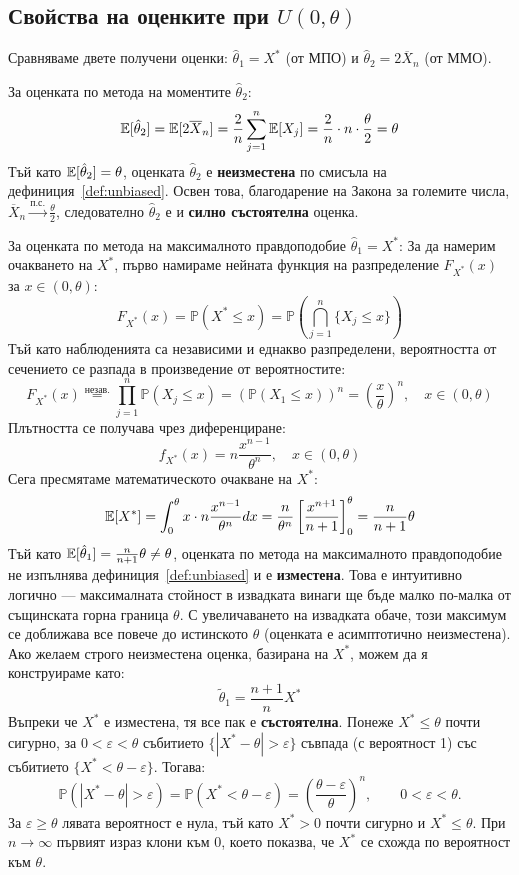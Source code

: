 \subsection{Свойства на оценките при $U(0, \theta)$}

Сравняваме двете получени оценки: $\hat{\theta}_1 = X^*$ (от МПО) и $\hat{\theta}_2 = 2 \overline{X}_n$ (от ММО).

За оценката по метода на моментите $\hat{\theta}_2$:
\[
    \mathbb{E}[\hat{\theta}_2] = \mathbb{E}[2 \overline{X}_n] = \frac{2}{n} \sum_{j=1}^n \mathbb{E}[X_j] = \frac{2}{n} \cdot n \cdot \frac{\theta}{2} = \theta
\]
Тъй като $\mathbb{E}[\hat{\theta}_2] = \theta$, оценката $\hat{\theta}_2$ е \textbf{неизместена} по смисъла на дефиниция~\ref{def:unbiased}. Освен това, благодарение на Закона за големите числа, $\overline{X}_n \xrightarrow{\text{п.с.}} \frac{\theta}{2}$, следователно $\hat{\theta}_2$ е и \textbf{силно състоятелна} оценка.

За оценката по метода на максималното правдоподобие $\hat{\theta}_1 = X^*$:
За да намерим очакването на $X^*$, първо намираме нейната функция на разпределение $F_{X^*}(x)$ за $x \in (0, \theta)$:
\[
    F_{X^*}(x) = \mathbb{P}(X^* \le x) = \mathbb{P}\left(\bigcap_{j=1}^n \{X_j \le x\}\right)
\]
Тъй като наблюденията са независими и еднакво разпределени, вероятността от сечението се разпада в произведение от вероятностите:
\[
    F_{X^*}(x) \stackrel{\text{незав.}}{=} \prod_{j=1}^n \mathbb{P}(X_j \le x) = \left( \mathbb{P}(X_1 \le x) \right)^n = \left(\frac{x}{\theta}\right)^n, \quad x \in (0, \theta)
\]
Плътността се получава чрез диференциране:
\[
    f_{X^*}(x) = n \frac{x^{n-1}}{\theta^n}, \quad x \in (0, \theta)
\]
Сега пресмятаме математическото очакване на $X^*$:
\[
    \mathbb{E}[X^*] = \int_0^\theta x \cdot n \frac{x^{n-1}}{\theta^n} dx = \frac{n}{\theta^n} \left[ \frac{x^{n+1}}{n+1} \right]_0^\theta = \frac{n}{n+1} \theta
\]
Тъй като $\mathbb{E}[\hat{\theta}_1] = \frac{n}{n+1} \theta \neq \theta$, оценката по метода на максималното правдоподобие не изпълнява дефиниция~\ref{def:unbiased} и е \textbf{изместена}. Това е интуитивно логично — максималната стойност в извадката винаги ще бъде малко по-малка от същинската горна граница $\theta$. С увеличаването на извадката обаче, този максимум се доближава все повече до истинското $\theta$ (оценката е асимптотично неизместена). Ако желаем строго неизместена оценка, базирана на $X^*$, можем да я конструираме като:
\[
    \tilde{\theta}_1 = \frac{n+1}{n} X^*
\]
Въпреки че $X^*$ е изместена, тя все пак е \textbf{състоятелна}. Понеже
$X^*\le\theta$ почти сигурно, за $0<\varepsilon<\theta$ събитието
$\{|X^*-\theta|>\varepsilon\}$ съвпада (с вероятност 1) със събитието
$\{X^*<\theta-\varepsilon\}$. Тогава:
\[
    \mathbb{P}(|X^*-\theta|>\varepsilon)
    =\mathbb{P}(X^*<\theta-\varepsilon)
    =\left(\frac{\theta-\varepsilon}{\theta}\right)^n,
    \qquad 0<\varepsilon<\theta.
\]
За $\varepsilon\ge\theta$ лявата вероятност е нула, тъй като $X^*>0$ почти
сигурно и $X^*\le\theta$. При $n \to \infty$ първият израз клони към 0,
което показва, че $X^*$ се схожда по вероятност към $\theta$.

